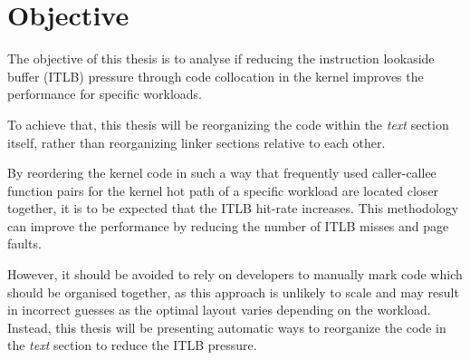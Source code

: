 \chapter{Objective}\label{chapt:objective}

The objective of this thesis is to analyse if reducing the instruction lookaside buffer (ITLB) pressure through code collocation in the kernel improves the performance for specific workloads.

To achieve that, this thesis will be reorganizing the code within the \textit{text} section itself, rather than reorganizing linker sections relative to each other.

By reordering the kernel code in such a way that frequently used caller-callee function pairs for the kernel hot path of a specific workload are located closer together, it is to be expected that the ITLB hit-rate increases. This methodology can improve the performance by reducing the number of ITLB misses and page faults.

However, it should be avoided to rely on developers to manually mark code which should be organised together, as this approach is unlikely to scale and may result in incorrect guesses as the optimal layout varies depending on the workload. Instead, this thesis will be presenting automatic ways to reorganize the code in the \textit{text} section to reduce the ITLB pressure.